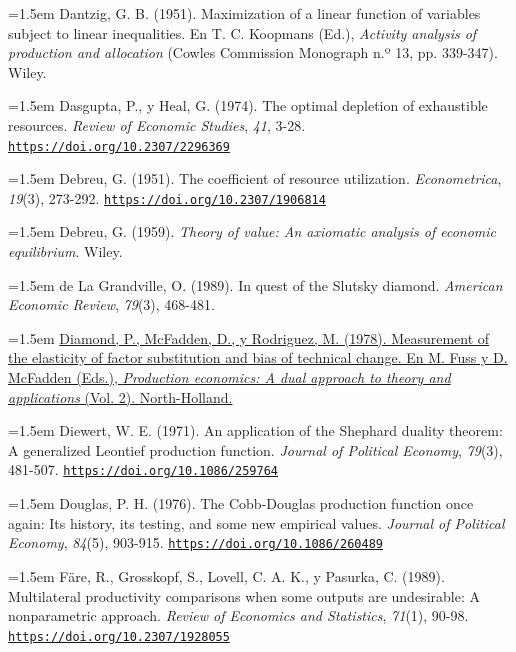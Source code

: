 \documentclass[10pt,a4paper]{article}
\begin{document}
\noindent\hangindent=1.5em Dantzig, G. B. (1951). Maximization of a linear function of variables subject to linear inequalities. En T. C. Koopmans (Ed.), \textit{Activity analysis of production and allocation} (Cowles Commission Monograph n.º 13, pp. 339-347). Wiley.

\noindent\hangindent=1.5em Dasgupta, P., y Heal, G. (1974). The optimal depletion of exhaustible resources. \textit{Review of Economic Studies}, \textit{41}, 3-28. \href{https://doi.org/10.2307/2296369}{\nolinkurl{https://doi.org/10.2307/2296369}}

\noindent\hangindent=1.5em Debreu, G. (1951). The coefficient of resource utilization. \textit{Econometrica}, \textit{19}(3), 273-292. \href{https://doi.org/10.2307/1906814}{\nolinkurl{https://doi.org/10.2307/1906814}}

\noindent\hangindent=1.5em Debreu, G. (1959). \textit{Theory of value: An axiomatic analysis of economic equilibrium}. Wiley.

\noindent\hangindent=1.5em de La Grandville, O. (1989). In quest of the Slutsky diamond. \textit{American Economic Review}, \textit{79}(3), 468-481.

\noindent\hangindent=1.5em \href{https://eml.berkeley.edu/~mcfadden/prodecon/apps/ch12.pdf}{Diamond, P., McFadden, D., y Rodriguez, M. (1978). Measurement of the elasticity of factor substitution and bias of technical change. En M. Fuss y D. McFadden (Eds.), \textit{Production economics: A dual approach to theory and applications} (Vol. 2). North-Holland.}

\noindent\hangindent=1.5em Diewert, W. E. (1971). An application of the Shephard duality theorem: A generalized Leontief production function. \textit{Journal of Political Economy}, \textit{79}(3), 481-507. \href{https://doi.org/10.1086/259764}{\nolinkurl{https://doi.org/10.1086/259764}}

\noindent\hangindent=1.5em Douglas, P. H. (1976). The Cobb-Douglas production function once again: Its history, its testing, and some new empirical values. \textit{Journal of Political Economy}, \textit{84}(5), 903-915. \href{https://doi.org/10.1086/260489}{\nolinkurl{https://doi.org/10.1086/260489}}

\noindent\hangindent=1.5em Färe, R., Grosskopf, S., Lovell, C. A. K., y Pasurka, C. (1989). Multilateral productivity comparisons when some outputs are undesirable: A nonparametric approach. \textit{Review of Economics and Statistics}, \textit{71}(1), 90-98. \href{https://doi.org/10.2307/1928055}{\nolinkurl{https://doi.org/10.2307/1928055}}
\end{document}
